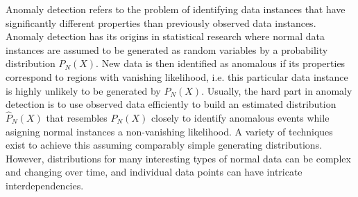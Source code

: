 \documentclass[a4paper,12pt,twoside]{report}
\begin{document}
Anomaly detection refers to the problem of identifying data instances that have significantly different properties than previously observed  data instances. Anomaly detection has its origins in statistical research where normal data instances are assumed to be generated as random variables by a probability distribution $P_\textit{N}(X)$. New data is then identified as anomalous if its properties correspond to regions with vanishing likelihood, i.e. this particular data instance is highly unlikely to be generated by $P_\textit{N}(X)$. Usually, the hard part in anomaly detection is to use observed data efficiently to build an estimated distribution $\hat{P}_\textit{N}(X)$ that resembles $P_\textit{N}(X)$ closely to identify anomalous events while asigning normal instances a non-vanishing likelihood. A variety of techniques exist to achieve this assuming comparably simple generating distributions. However, distributions for many interesting types of normal data can be complex and changing over time, and individual data points can have intricate interdependencies. 
\end{document}
